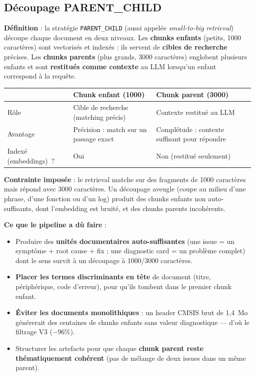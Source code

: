 \documentclass[12pt,a4paper]{report}
\begin{document}
\subsection{Découpage PARENT\_CHILD}
\label{sec:parent_child}

\textbf{Définition} : la stratégie \texttt{PARENT\_CHILD} (aussi appelée \textit{small-to-big retrieval}) découpe chaque document en deux niveaux. Les \textbf{chunks enfants} (petits, 1000 caractères) sont vectorisés et indexés : ils servent de \textbf{cibles de recherche} précises. Les \textbf{chunks parents} (plus grands, 3000 caractères) englobent plusieurs enfants et sont \textbf{restitués comme contexte} au LLM lorsqu'un enfant correspond à la requête.

\begin{longtable}{p{3cm}p{5cm}p{5cm}}
\toprule
 & \textbf{Chunk enfant (1000)} & \textbf{Chunk parent (3000)} \\
\midrule
Rôle & Cible de recherche (matching précis) & Contexte restitué au LLM \\
Avantage & Précision : match sur un passage exact & Complétude : contexte suffisant pour répondre \\
Indexé (embeddings)~? & Oui & Non (restitué seulement) \\
\bottomrule
\end{longtable}

\textbf{Contrainte imposée} : le retrieval matche sur des fragments de 1000 caractères mais répond avec 3000 caractères. Un découpage aveugle (coupe au milieu d'une phrase, d'une fonction ou d'un log) produit des chunks enfants non auto-suffisants, dont l'embedding est bruité, et des chunks parents incohérents.

\textbf{Ce que le pipeline a dû faire} :
\begin{itemize}
  \item Produire des \textbf{unités documentaires auto-suffisantes} (une issue = un symptôme + root cause + fix ; une diagnostic card = un problème complet) dont le sens survit à un découpage à 1000/3000 caractères.
  \item \textbf{Placer les termes discriminants en tête} de document (titre, périphérique, code d'erreur), pour qu'ils tombent dans le premier chunk enfant.
  \item \textbf{Éviter les documents monolithiques} : un header CMSIS brut de 1,4~Mo générerait des centaines de chunks enfants sans valeur diagnostique --- d'où le filtrage V3 ($-96\%$).
  \item Structurer les artefacts pour que chaque \textbf{chunk parent reste thématiquement cohérent} (pas de mélange de deux issues dans un même parent).
\end{itemize}
\end{document}
